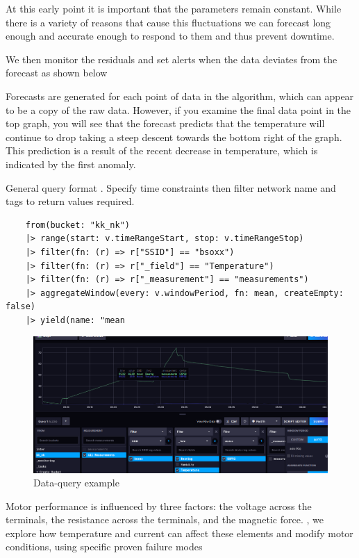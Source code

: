 At this early point it is important that the parameters remain constant. While there is a variety of reasons that cause this fluctuations we can forecast long enough and accurate enough to respond to them and thus prevent downtime.

We then monitor the residuals and set alerts when the data deviates from the forecast as shown below

Forecasts are generated for each point of data in the algorithm, which can appear to be a copy of the raw data. However, if you examine the final data point in the top graph, you will see that the forecast predicts that the temperature will continue to drop taking a steep descent towards the bottom right of the graph. This prediction is a result of the recent decrease in temperature, which is indicated by the first anomaly.

\pagebreak
 General query format . Specify time constraints then filter network name and tags to return values required.
 \begin{lstlisting}
 	from(bucket: "kk_nk")
 	|> range(start: v.timeRangeStart, stop: v.timeRangeStop)
 	|> filter(fn: (r) => r["SSID"] == "bsoxx")
 	|> filter(fn: (r) => r["_field"] == "Temperature")
 	|> filter(fn: (r) => r["_measurement"] == "measurements")
 	|> aggregateWindow(every: v.windowPeriod, fn: mean, createEmpty: false)
 	|> yield(name: "mean
 \end{lstlisting}
 
\begin{figure}[!h]
	\includegraphics[width=1.0\linewidth]{Figures/dataquerying}
	\caption{Data-query example}
\end{figure}

\pagebreak
Motor performance is influenced by three factors: the voltage across the terminals, the resistance across the terminals, and the magnetic force. , we  explore how temperature and current  can affect these elements and modify motor conditions, using specific proven failure modes 

